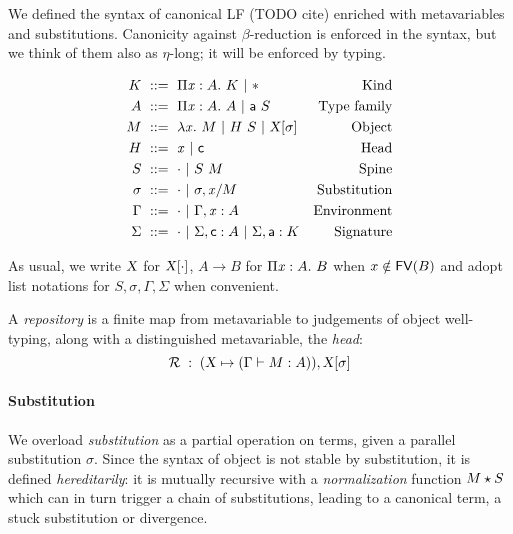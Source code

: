\documentclass[9pt]{sigplanconf}
\begin{document}
We defined the syntax of canonical LF (TODO cite) enriched with
metavariables and substitutions. Canonicity against $\beta$-reduction
is enforced in the syntax, but we think of them also as $\eta$-long;
it will be enforced by typing.

\begin{align*}
  K &\ ::=\ 
  \Pi{\ensuremath{\text{\textit{x}}}}:{A}.\  K \ |\ 
  \mathsf{*} &
  \text{Kind}\\
  A &\ ::=\ 
  \Pi{\ensuremath{\text{\textit{x}}}}:{A}.\  A \ |\ 
  {\text{\textsf{a}}}\  S &
  \text{Type family}\\
  M &\ ::=\ 
  \lambda{\ensuremath{\text{\textit{x}}}}.\  M \ |\ 
  {H}\  S \ |\ 
  {\text{\textsl{X}}}[{\sigma}] &
  \text{Object}\\
  H &\ ::=\ 
  \text{\textit{x}} \ |\ 
  \text{\textsf{c}} &
  \text{Head}\\
  S &\ ::=\ 
  \cdot \ |\ 
  {S}\ {M} &
  \text{Spine}\\
  \sigma &\ ::=\ 
  \cdot \ |\ 
  {\sigma},{{\text{\textit{x}}}/{M}} &
  \text{Substitution} \\
  \Gamma &\ ::=\ 
  \cdot \ |\ 
  {\Gamma},{{\text{\textit{x}}}:{A}} &
  \text{Environment} \\
  \Sigma &\ ::=\ 
  \cdot \ |\ 
  {\Sigma},{\text{\textsf{c}} : A} \ |\ 
  {\Sigma},{\text{\textsf{a}} : K} &
  \text{Signature}
\end{align*}

As usual, we write $\text{\textsl{X}}$ for ${\text{\textsl{X}}}[{\cdot}]$, $A\to B$ for
$\Pi{\ensuremath{\text{\textit{x}}}}:{A}.\  B$ when $x\notin {\rm\mathsf{FV}}({B})$ and adopt list notations for $S,
\sigma, \Gamma, \Sigma$ when convenient.

A \emph{repository} is a finite map from metavariable to judgements of
object well-typing, along with a distinguished metavariable, the
\emph{head}:
$$ \mathcal{R}\;:\;(\text{\textsl{X}} \mapsto (\Gamma\vdash{M}:{A})), {\text{\textsl{X}}}[{\sigma}] $$

\paragraph{Substitution} We overload \emph{substitution} as a partial
operation on terms, given a parallel substitution $\sigma$. Since the
syntax of object is not stable by substitution, it is defined
\emph{hereditarily}: it is mutually recursive with a
\emph{normalization} function ${M}\star{S}$ which can in turn trigger a
chain of substitutions, leading to a canonical term, a stuck
substitution or divergence. %
\end{document}
